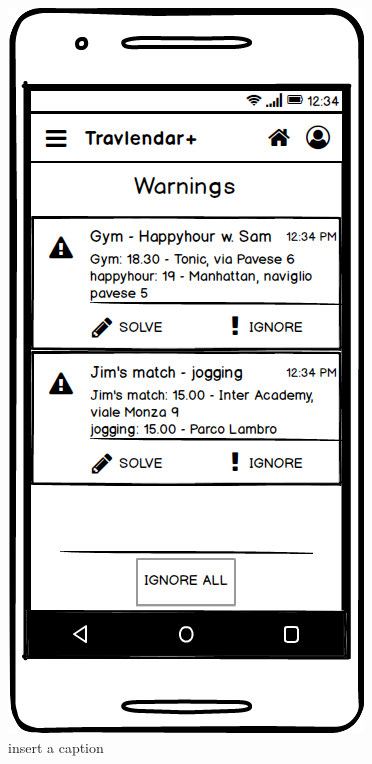 \documentclass[11pt]{article}
\begin{document}
	\begin{figure}
		\centering
		\includegraphics[width=0.7\linewidth]{Warnings.png}
		\caption{insert a caption}
		\label{fig:warnings}
	\end{figure}
	
\end{document}
